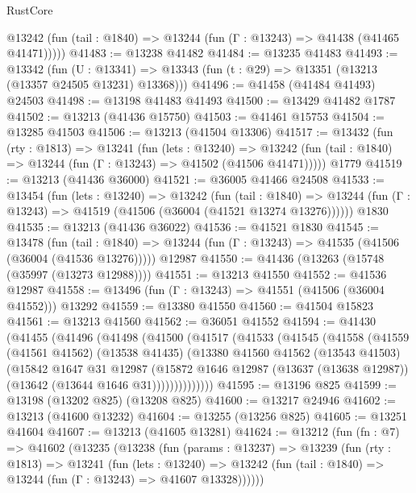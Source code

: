 \begin{lexlean}{RustCore}
\begin{coremodule}
      @13242 (fun (tail : @1840) => @13244 (fun (Γ : @13243) => @41438 (@41465 @41471)))))
@41483 := @13238 @41482
@41484 := @13235 @41483
@41493 := @13342
    (fun (U : @13341) => @13343 (fun (t : @29) => @13351 (@13213 (@13357 @24505 @13231) @13368)))
@41496 := @41458 (@41484 @41493) @24503
@41498 := @13198 @41483 @41493
@41500 := @13429 @41482 @1787
@41502 := @13213 (@41436 @15750)
@41503 := @41461 @15753
@41504 := @13285 @41503
@41506 := @13213 (@41504 @13306)
@41517 := @13432
    (fun (rty : @1813) =>
    @13241
      (fun (lets : @13240) =>
      @13242 (fun (tail : @1840) => @13244 (fun (Γ : @13243) => @41502 (@41506 @41471)))))
    @1779
@41519 := @13213 (@41436 @36000)
@41521 := @36005 @41466 @24508
@41533 := @13454
    (fun (lets : @13240) =>
    @13242
      (fun (tail : @1840) =>
      @13244 (fun (Γ : @13243) => @41519 (@41506 (@36004 (@41521 @13274 @13276))))))
    @1830
@41535 := @13213 (@41436 @36022)
@41536 := @41521 @1830
@41545 := @13478
    (fun (tail : @1840) => @13244 (fun (Γ : @13243) => @41535 (@41506 (@36004 (@41536 @13276)))))
    @12987
@41550 := @41436 (@13263 (@15748 (@35997 (@13273 @12988))))
@41551 := @13213 @41550
@41552 := @41536 @12987
@41558 := @13496 (fun (Γ : @13243) => @41551 (@41506 (@36004 @41552))) @13292
@41559 := @13380 @41550
@41560 := @41504 @15823
@41561 := @13213 @41560
@41562 := @36051 @41552
@41594 := @41430
    (@41455
      (@41496
        (@41498
          (@41500
            (@41517
              (@41533
                (@41545
                  (@41558
                    (@41559
                      (@41561 @41562)
                      (@13538 @41435)
                      (@13380
                        @41560
                        @41562
                        (@13543 @41503)
                        (@15842
                          @1647
                          @31
                          @12987
                          (@15872
                            @1646
                            @12987
                            (@13637 (@13638 @12987))
                            (@13642 (@13644 @1646 @31))))))))))))))
@41595 := @13196 @825
@41599 := @13198 (@13202 @825) (@13208 @825)
@41600 := @13217 @24946
@41602 := @13213 (@41600 @13232)
@41604 := @13255 (@13256 @825)
@41605 := @13251 @41604
@41607 := @13213 (@41605 @13281)
@41624 := @13212
    (fun (fn : @7) =>
    @41602
      (@13235
        (@13238
          (fun (params : @13237) =>
          @13239
            (fun (rty : @1813) =>
            @13241
              (fun (lets : @13240) =>
              @13242 (fun (tail : @1840) => @13244 (fun (Γ : @13243) => @41607 @13328))))))

\end{coremodule}
\end{lexlean}
